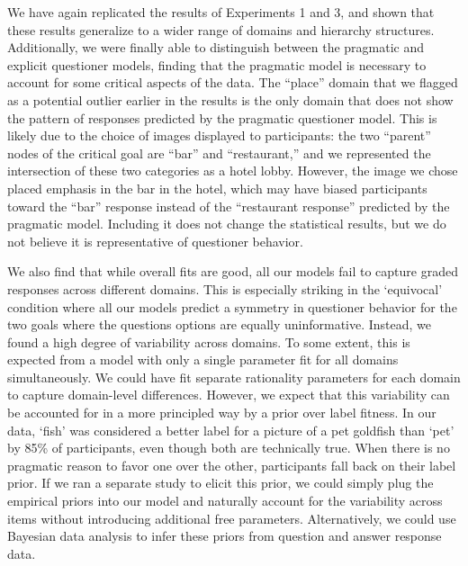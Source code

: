 \documentclass[12pt, floatsintext, man]{apa6}
\begin{document}
We have again replicated the results of Experiments 1 and 3, and shown that these results generalize to a wider range of domains and hierarchy structures. Additionally, we were finally able to distinguish between the pragmatic and explicit questioner models, finding that the pragmatic model is necessary to account for some critical aspects of the data. The ``place'' domain that we flagged as a potential outlier earlier in the results is the only domain that does not show the pattern of responses predicted by the pragmatic questioner model. This is likely due to the choice of images displayed to participants: the two ``parent'' nodes of the critical goal are ``bar'' and ``restaurant,'' and we represented the intersection of these two categories as a hotel lobby. However, the image we chose placed emphasis in the bar in the hotel, which may have biased participants toward the ``bar'' response instead of the ``restaurant response'' predicted by the pragmatic model. Including it does not change the statistical results, but we do not believe it is representative of questioner behavior. 

We also find that while overall fits are good, all our models fail to capture graded responses across different domains. This is especially striking in the `equivocal' condition where all our models predict a symmetry in questioner behavior for the two goals where the questions options are equally uninformative. Instead, we found a high degree of variability across domains. To some extent, this is expected from a model with only a single parameter fit for all domains simultaneously. We could have fit separate rationality parameters for each domain to capture domain-level differences. However, we expect that this variability can be accounted for in a more principled way by a prior over label fitness. In our data, `fish' was considered a better label for a picture of a pet goldfish than `pet' by 85\% of participants, even though both are technically true. When there is no pragmatic reason to favor one over the other, participants fall back on their label prior. If we ran a separate study to elicit this prior, we could simply plug the empirical priors into our model and naturally account for the variability across items without introducing additional free parameters. Alternatively, we could use Bayesian data analysis to infer these priors from question and answer response data. 
\end{document}
